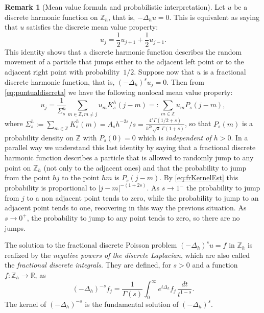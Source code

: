 \documentclass[a4paper,11pt,reqno]{amsart}
\newcommand{\R}{\mathbb{R}}
\newcommand{\Z}{\mathbb{Z}}
\theoremstyle{definition}
\newtheorem{rem}[thm]{Remark}
\numberwithin{equation}{section}
\begin{document}
\begin{rem}[Mean value formula and probabilistic interpretation]
Let $u$ be a discrete harmonic function on $\Z_h$, that is,
$-\Delta_hu=0$. This is equivalent as saying that $u$ satisfies the discrete mean value property:
\[
u_{j} = \frac12u_{j+1} +\frac12 u_{j-1}.
\]
This identity shows that a
discrete harmonic function describes the random movement of a particle that jumps either to the adjacent left
point or to the adjacent right point with probability~$1/2$.
Suppose now that $u$ is a fractional discrete harmonic function, that is, $(-\Delta_h)^su_j=0$. Then
from \eqref{eq:puntualdiscreta} we have the following nonlocal mean value property:
\[
u_j=\frac{1}{\Sigma^h_s}\sum_{m\in\Z,m\neq j}u_{m}K^h_s(j-m)=:\sum_{m\in\Z}u_mP_s(j-m),
\]
where $\Sigma^h_s:=\sum_{m\in\Z}K^h_s(m)=A_sh^{-2s}/s=
\frac{4^s\Gamma(1/2+s)}{h^{2s}\sqrt{\pi}\,\Gamma(1+s)}$,
so that $P_s(m)$ is a probability density on $\Z$ with $P_s(0)=0$ which is \textit{independent of $h>0$}.
In a parallel way we understand this last identity by saying that a
fractional discrete harmonic function describes a particle
that is allowed to randomly jump to any point on $\Z_h$ (not only to the adjacent ones)
and that the probability to jump from the point $hj$ to the point $hm$ is $P_s(j-m)$.
By \eqref{eq:frKernelEst} this probability is proportional to $|j-m|^{-(1+2s)}$.
As $s\to1^-$ the probability to jump from $j$ to a non adjacent point tends to zero, while the probability
to jump to an adjacent point tends to one, recovering in this way the previous situation. As $s\to0^+$,
the probability to jump to any point tends to zero, so there are no jumps.
\end{rem}

The solution to the fractional discrete Poisson problem $(-\Delta_h)^su=f$ in $\Z_h$ is
realized by the \textit{negative powers of the discrete Laplacian},
which are also called the \textit{fractional discrete integrals}.
They are defined, for $s>0$ and a function $f:\Z_h\to\R$, as
\begin{equation}
\label{eq:fractionalintegralsemigrupo}
(-\Delta_h)^{-s}f_{j} = \frac{1}{\Gamma(s)} \int_0^{\infty}e^{t\Delta_h}f_{j}\,\frac{dt}{t^{1-s}}.
\end{equation}
The kernel of $(-\Delta_h)^{-s}$ is the fundamental solution of $(-\Delta_h)^s$.
\end{document}

